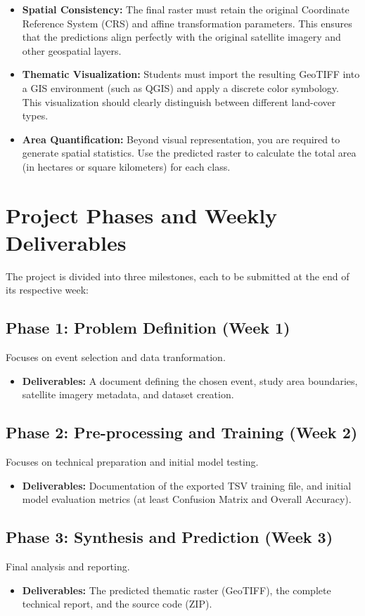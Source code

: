 \documentclass{article}
\begin{document}
\begin{itemize}
    \item \textbf{Spatial Consistency:} The final raster must retain the original Coordinate Reference System (CRS) and affine transformation parameters. This ensures that the predictions align perfectly with the original satellite imagery and other geospatial layers.
    \item \textbf{Thematic Visualization:} Students must import the resulting GeoTIFF into a GIS environment (such as QGIS) and apply a discrete color symbology. This visualization should clearly distinguish between different land-cover types.
    \item \textbf{Area Quantification:} Beyond visual representation, you are required to generate spatial statistics. Use the predicted raster to calculate the total area (in hectares or square kilometers) for each class.
\end{itemize}

\section{Project Phases and Weekly Deliverables}
The project is divided into three milestones, each to be submitted at the end of its respective week:

\subsection*{Phase 1: Problem Definition (Week 1)}
Focuses on event selection and data tranformation.
\begin{itemize}
    \item \textbf{Deliverables:} A document defining the chosen event, study area boundaries, satellite imagery metadata, and dataset creation.
\end{itemize}

\subsection*{Phase 2: Pre-processing and Training (Week 2)}
Focuses on technical preparation and initial model testing.
\begin{itemize}
    \item \textbf{Deliverables:} Documentation of the exported TSV training file, and initial model evaluation metrics (at least Confusion Matrix and Overall Accuracy).
\end{itemize}

\subsection*{Phase 3: Synthesis and Prediction (Week 3)}
Final analysis and reporting.
\begin{itemize}
    \item \textbf{Deliverables:} The predicted thematic raster (GeoTIFF), the complete technical report, and the source code (ZIP).
\end{itemize}
\end{document}
